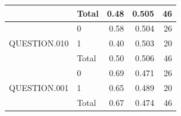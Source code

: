 \documentclass[a4paper]{article}
\begin{document}
\begin{table}[H]
\begin{center}
\begin{tabular}{|l|l|r|r|r|}
\cline{2-5}
                               & Total & 0.48                      & 0.505                               & 46                      \\ 
\hline
\multirow{3}{*}{QUESTION.010}  & 0     & 0.58                      & 0.504                               & 26                      \\ 
\cline{2-5}
                               & 1     & 0.40                      & 0.503                               & 20                      \\ 
\cline{2-5}
                               & Total & 0.50                      & 0.506                               & 46                      \\ 
\hline
\multirow{3}{*}{QUESTION.001}  & 0     & 0.69                      & 0.471                               & 26                      \\ 
\cline{2-5}
                               & 1     & 0.65                      & 0.489                               & 20                      \\ 
\cline{2-5}
                               & Total & 0.67                      & 0.474                               & 46                      \\
\hline
\end{tabular}
\end{center}
\end{table}

\end{document}
